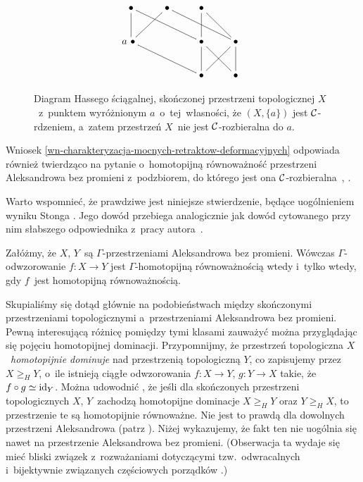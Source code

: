 \begin{figure}[h]
\[
\xymatrix{\bullet\ar@{-}[d]\ar@{-}[drr] & \bullet\ar@{-}[dl]\ar@{-}[drr] & \bullet\ar@{-}[d]\ar@{-}[dr]\\
\!\!\!a\ \bullet\ar@{-}[drr] & & \bullet\ar@{-}[d]\ar@{-}[dr] & \bullet\ar@{-}[d]\ar@{-}[dl]\\
& & \bullet & \bullet}
\]
\caption{Diagram Hassego ściągalnej, skończonej przestrzeni topologicznej $X$~z~punktem wyróżnionym $a$~o~tej~własności, że $(X,\{a\})$ jest $\mathcal{C}$-rdzeniem, a~zatem przestrzeń $X$~nie jest $\mathcal{C}$-rozbieralna do $a$.}\label{fig-punkt_nie_bedacy_mocnym_retraktem_deformacyjnym}
\end{figure}

Wniosek \ref{wn-charakteryzacja-mocnych-retraktow-deformacyjnych} odpowiada również twierdząco na pytanie o~homotopijną równoważność przestrzeni Aleksandrowa bez promieni z~podzbiorem, do którego jest ona $\mathcal{C}$-rozbieralna~\cite[Problem 4]{Kukiela10a}, \cite[Question 3]{Kukiela10}.

Warto wspomnieć, że prawdziwe jest niniejsze stwierdzenie, będące uogólnieniem wyniku Stonga \cite{Stong84}. Jego dowód przebiega analogicznie jak dowód cytowanego przy nim słabszego odpowiednika z~pracy autora~\cite{Kukiela10}.
\begin{stw}
Załóżmy, że $X$, $Y$~są \mbox{$\Gamma$-przestrzeniami} Aleksandrowa bez promieni. Wówczas $\Gamma$-odwzorowanie $f:X\to Y$ jest $\Gamma$-homotopijną równoważnością wtedy i~tylko wtedy, gdy $f$~jest homotopijną równoważnością.
\end{stw}

Skupialiśmy się dotąd głównie na podobieństwach między skończonymi przestrzeniami topologicznymi a~przestrzeniami Aleksandrowa bez promieni. Pewną interesującą różnicę pomiędzy tymi klasami zauważyć można przyglądając się pojęciu homotopijnej dominacji. Przypomnijmy, że przestrzeń topologiczna $X$~\textit{homotopijnie dominuje} nad przestrzenią topologiczną $Y$, co zapisujemy przez $X\geq_H Y$, o~ile istnieją ciągłe odwzorowania $f\colon X\to Y$, $g\colon Y\to X$ takie, że $f\circ g\simeq \operatorname{id}_Y$. Można udowodnić \cite[stwierdzenie III.3.1]{Kukiela10a}, że jeśli dla skończonych przestrzeni topologicznych $X$, $Y$~zachodzą homotopijne dominacje $X\geq_H Y$ oraz $Y\geq_H X$, to przestrzenie te są homotopijnie równoważne. Nie jest to prawdą dla dowolnych przestrzeni Aleksandrowa (patrz \cite[przykład III.3.2]{Kukiela10a}). Niżej wykazujemy, że fakt ten nie uogólnia się nawet na przestrzenie Aleksandrowa bez promieni. (Obserwacja ta wydaje się mieć bliski związek z~rozważaniami dotyczącymi tzw.~odwracalnych i~bijektywnie związanych częściowych porządków \cite{Kukiela09,Kukiela13a}.)

